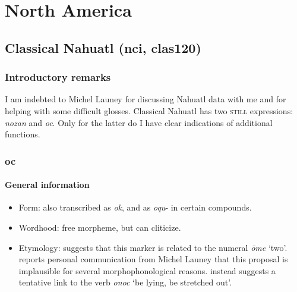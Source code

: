 \chapter{North America}
\label{appendixNorthAmerica}

\section{Classical Nahuatl (nci, clas120)}\label{appendixClassicalNahuatl}
\subsection{Introductory remarks}
I am indebted to Michel Launey for discussing Nahuatl data with me and for helping with some difficult glosses. Classical Nahuatl has two \textsc{still} expressions: \textit{nozan} and \textit{oc}. Only for the latter do I have clear indications of additional functions.

\subsection{oc}
\subsubsection{General information}
\begin{itemize}
	\item Form: also transcribed as \textit{ok}, and as \mbox{\textit{oqu}-} in certain compounds.
	\item Wordhood: free morpheme, but can cliticize.
	\item Etymology: \textcite[92]{Karttunen1992} suggests that this marker is related to the numeral \textit{ōme} \lq two'. \Textcite[92]{vanBaar1997} reports personal communication from Michel Launey that this proposal is implausible for several morphophonological reasons. \Textcite{vanBaar1997} instead suggests a tentative link to the verb \textit{onoc} \lq be lying, be stretched out'.
\end{itemize}

